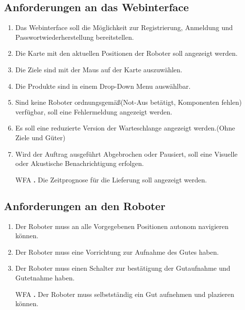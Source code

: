 \subsection{Anforderungen an das Webinterface}
\begin{enumerate}[nosep,style=sameline]
\renewcommand{\labelenumi}{LFA \textbf{\theenumi.}}
\item Das Webinterface soll die Möglichkeit zur Registrierung, Anmeldung und Passwortwiederherstellung bereitstellen.
\item Die Karte mit den aktuellen Positionen der Roboter soll angezeigt werden.
\item Die Ziele sind mit der Maus auf der Karte auszuwählen.
\item Die Produkte sind in einem Drop-Down Menu auswählbar.
\item Sind keine Roboter ordnungsgemäß(Not-Aus betätigt, Komponenten fehlen)  verfügbar, soll eine Fehlermeldung angezeigt werden.
\item Es soll eine reduzierte Version der Warteschlange angezeigt werden.(Ohne Ziele und Güter)
\item Wird der Auftrag ausgeführt Abgebrochen oder Pausiert, soll eine Visuelle oder Akustische Benachrichtigung erfolgen.
\item[WFA \textbf{\theenumi.}] Die Zeitprognose für die Lieferung soll angezeigt werden.
\end{enumerate}

\subsection{Anforderungen an den Roboter}
\begin{enumerate}[nosep,style=sameline]
\renewcommand{\labelenumi}{NFA \textbf{\theenumi.}}
\item Der Roboter muss an alle Vorgegebenen Positionen autonom navigieren können.
\item Der Roboter muss eine Vorrichtung zur Aufnahme des Gutes haben.
\item Der Roboter muss einen Schalter zur bestätigung der Gutaufnahme und Gutetnahme haben.
\item[WFA \textbf{\theenumi.}] Der Roboter muss selbstständig ein Gut aufnehmen und plazieren können.
\end{enumerate}

